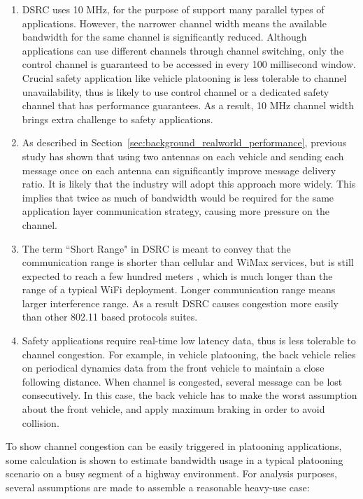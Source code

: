 \documentclass[12pt]{report}
\begin{document}
\begin{enumerate}
  \item DSRC uses 10 MHz, for the purpose of support many parallel types of applications. However, the narrower channel width means the available bandwidth for the same channel is significantly reduced. Although applications can use different channels through channel switching, only the control channel is guaranteed to be accessed in every 100 millisecond window. Crucial safety application like vehicle platooning is less tolerable to channel unavailability, thus is likely to use control channel or a dedicated safety channel that has performance guarantees. As a result, 10 MHz channel width brings extra challenge to safety applications.
  \item As described in Section~\ref{sec:background_realworld_performance}, previous study \cite{songDSRC2016} has shown that using two antennas on each vehicle and sending each message once on each antenna can significantly improve message delivery ratio. It is likely that the industry will adopt this approach more widely. This implies that twice as much of bandwidth would be required for the same application layer communication strategy, causing more pressure on the channel.
  \item The term ``Short Range" in DSRC is meant to convey that the communication range is shorter than cellular and WiMax services, but is still expected to reach a few hundred meters \cite{kenney2011}, which is much longer than the range of a typical WiFi deployment. Longer communication range means larger interference range. As a result DSRC causes congestion more easily than other 802.11 based protocols suites.
  \item Safety applications require real-time low latency data, thus is less tolerable to channel congestion. For example, in vehicle platooning, the back vehicle relies on periodical dynamics data from the front vehicle to maintain a close following distance. When channel is congested, several message can be lost consecutively. In this case, the back vehicle has to make the worst assumption about the front vehicle, and apply maximum braking in order to avoid collision.
\end{enumerate}

To show channel congestion can be easily triggered in platooning applications, some calculation is shown to estimate bandwidth usage in a typical platooning scenario on a busy segment of a highway environment. For analysis purposes, several assumptions are made to assemble a reasonable heavy-use case:
\end{document}
